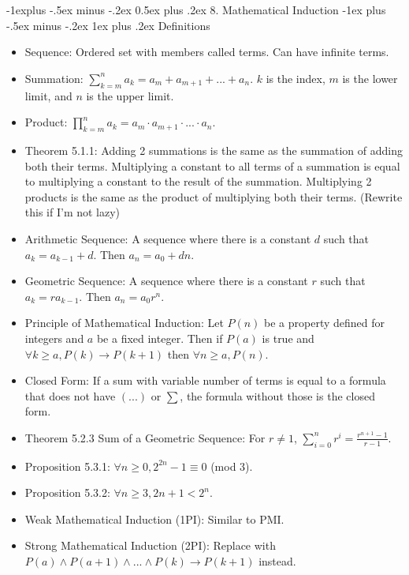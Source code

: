 \documentclass[10pt, portrait]{article}
\makeatletter
\renewcommand{\section}{\@startsection{section}{1}{0mm}%
                                {-1ex plus -.5ex minus -.2ex}%
                                {0.5ex plus .2ex}%
                                {\normalfont\large\bfseries}}
\renewcommand{\section}{\@startsection{section}{2}{0mm}%
                                {-1explus -.5ex minus -.2ex}%
                                {0.5ex plus .2ex}%
                                {\normalfont\normalsize\bfseries}}
\renewcommand{\subsection}{\@startsection{subsection}{3}{0mm}%
                                {-1ex plus -.5ex minus -.2ex}%
                                {1ex plus .2ex}%
                                {\normalfont\small\bfseries}}%
\makeatother
\begin{document}
\begin{multicols*}{2}
\section{8. Mathematical Induction}
\subsection{Definitions}
\begin{itemize}
    \item Sequence: Ordered set with members called terms. Can have infinite terms.
    \item Summation: $\sum_{k=m}^{n} a_k = a_m + a_{m+1} + ... + a_n$. $k$ is the index, $m$ is the lower limit, and $n$ is the upper limit.
    \item Product:
    $\prod_{k=m}^{n} a_k = a_m \cdot a_{m+1} \cdot ... \cdot a_n$.
    \item Theorem 5.1.1: Adding 2 summations is the same as the summation of adding both their terms. Multiplying a constant to all terms of a summation is equal to multiplying a constant to the result of the summation. Multiplying 2 products is the same as the product of multiplying both their terms. (Rewrite this if I'm not lazy)
    \item Arithmetic Sequence: A sequence where there is a constant $d$ such that $a_k = a_{k-1} + d$. Then $a_n = a_0 + dn$.
    \item Geometric Sequence: A sequence where there is a constant $r$ such that $a_k = ra_{k-1}$. Then $a_n = a_0 r^n$.
    \item Principle of Mathematical Induction: Let $P(n)$ be a property defined for integers and $a$ be a fixed integer. Then if $P(a)$ is true and $\forall k \geq a, P(k) \rightarrow P(k+1)$ then $\forall n \geq a, P(n)$.
    \item Closed Form: If a sum with variable number of terms is equal to a formula that does not have $(...)$ or $\sum$, the formula without those is the closed form.
    \item Theorem 5.2.3 Sum of a Geometric Sequence: For $r \neq 1$, $\sum_{i=0}^{n} r^i = \frac{r^{n+1}-1}{r-1}$.
    \item Proposition 5.3.1: $\forall n \geq 0, 2^{2n}-1 \equiv 0$ (mod 3).
    \item Proposition 5.3.2: $\forall n \geq 3, 2n+1 < 2^{n}$.
    \item Weak Mathematical Induction (1PI): Similar to PMI.
    \item Strong Mathematical Induction (2PI): Replace with $P(a) \land P(a+1) \land ... \land P(k) \rightarrow P(k+1)$ instead.

\end{itemize}
\end{multicols*}
\end{document}
